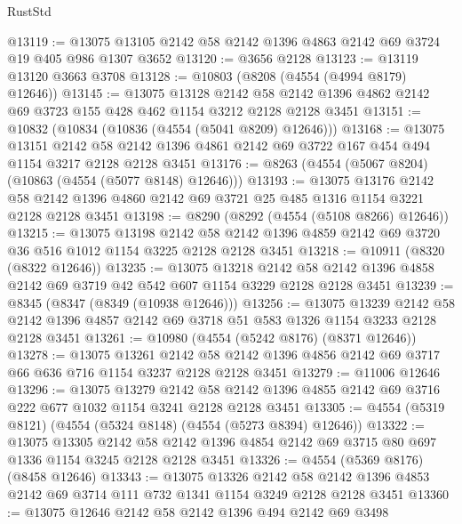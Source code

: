 \begin{lexlean}{RustStd}
\begin{coremodule}
{\begin{coremodule}
{{{{{{{{{{{{{{{{@13119 := @13075 @13105 @2142 @58 @2142 @1396 @4863 @2142 @69 @3724 @19 @405 @986 @1307 @3652
@13120 := @3656 @2128
@13123 := @13119 @13120 @3663 @3708
@13128 := @10803 (@8208 (@4554 (@4994 @8179) @12646))
@13145 := @13075
    @13128
    @2142
    @58
    @2142
    @1396
    @4862
    @2142
    @69
    @3723
    @155
    @428
    @462
    @1154
    @3212
    @2128
    @2128
    @3451
@13151 := @10832 (@10834 (@10836 (@4554 (@5041 @8209) @12646)))
@13168 := @13075
    @13151
    @2142
    @58
    @2142
    @1396
    @4861
    @2142
    @69
    @3722
    @167
    @454
    @494
    @1154
    @3217
    @2128
    @2128
    @3451
@13176 := @8263 (@4554 (@5067 @8204) (@10863 (@4554 (@5077 @8148) @12646)))
@13193 := @13075
    @13176
    @2142
    @58
    @2142
    @1396
    @4860
    @2142
    @69
    @3721
    @25
    @485
    @1316
    @1154
    @3221
    @2128
    @2128
    @3451
@13198 := @8290 (@8292 (@4554 (@5108 @8266) @12646))
@13215 := @13075
    @13198
    @2142
    @58
    @2142
    @1396
    @4859
    @2142
    @69
    @3720
    @36
    @516
    @1012
    @1154
    @3225
    @2128
    @2128
    @3451
@13218 := @10911 (@8320 (@8322 @12646))
@13235 := @13075
    @13218
    @2142
    @58
    @2142
    @1396
    @4858
    @2142
    @69
    @3719
    @42
    @542
    @607
    @1154
    @3229
    @2128
    @2128
    @3451
@13239 := @8345 (@8347 (@8349 (@10938 @12646)))
@13256 := @13075
    @13239
    @2142
    @58
    @2142
    @1396
    @4857
    @2142
    @69
    @3718
    @51
    @583
    @1326
    @1154
    @3233
    @2128
    @2128
    @3451
@13261 := @10980 (@4554 (@5242 @8176) (@8371 @12646))
@13278 := @13075
    @13261
    @2142
    @58
    @2142
    @1396
    @4856
    @2142
    @69
    @3717
    @66
    @636
    @716
    @1154
    @3237
    @2128
    @2128
    @3451
@13279 := @11006 @12646
@13296 := @13075
    @13279
    @2142
    @58
    @2142
    @1396
    @4855
    @2142
    @69
    @3716
    @222
    @677
    @1032
    @1154
    @3241
    @2128
    @2128
    @3451
@13305 := @4554 (@5319 @8121) (@4554 (@5324 @8148) (@4554 (@5273 @8394) @12646))
@13322 := @13075
    @13305
    @2142
    @58
    @2142
    @1396
    @4854
    @2142
    @69
    @3715
    @80
    @697
    @1336
    @1154
    @3245
    @2128
    @2128
    @3451
@13326 := @4554 (@5369 @8176) (@8458 @12646)
@13343 := @13075
    @13326
    @2142
    @58
    @2142
    @1396
    @4853
    @2142
    @69
    @3714
    @111
    @732
    @1341
    @1154
    @3249
    @2128
    @2128
    @3451
@13360 := @13075
    @12646
    @2142
    @58
    @2142
    @1396
    @494
    @2142
    @69
    @3498
}}}}}}}}}}}}}}}}
\end{coremodule}}
\end{coremodule}
\end{lexlean}
